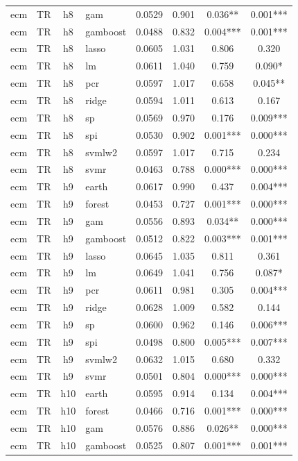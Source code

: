 \begin{ThreePartTable}
\begin{longtable}[t]{llclcccc}
ecm & TR & h8 & gam & 0.0529 & 0.901 & 0.036** & 0.001***\\
ecm & TR & h8 & gamboost & 0.0488 & 0.832 & 0.004*** & 0.001***\\
ecm & TR & h8 & lasso & 0.0605 & 1.031 & 0.806 & 0.320\\
ecm & TR & h8 & lm & 0.0611 & 1.040 & 0.759 & 0.090*\\
ecm & TR & h8 & pcr & 0.0597 & 1.017 & 0.658 & 0.045**\\
ecm & TR & h8 & ridge & 0.0594 & 1.011 & 0.613 & 0.167\\
ecm & TR & h8 & sp & 0.0569 & 0.970 & 0.176 & 0.009***\\
ecm & TR & h8 & spi & 0.0530 & 0.902 & 0.001*** & 0.000***\\
ecm & TR & h8 & svmlw2 & 0.0597 & 1.017 & 0.715 & 0.234\\
ecm & TR & h8 & svmr & 0.0463 & 0.788 & 0.000*** & 0.000***\\
\addlinespace
ecm & TR & h9 & earth & 0.0617 & 0.990 & 0.437 & 0.004***\\
ecm & TR & h9 & forest & 0.0453 & 0.727 & 0.001*** & 0.000***\\
ecm & TR & h9 & gam & 0.0556 & 0.893 & 0.034** & 0.000***\\
ecm & TR & h9 & gamboost & 0.0512 & 0.822 & 0.003*** & 0.001***\\
ecm & TR & h9 & lasso & 0.0645 & 1.035 & 0.811 & 0.361\\
ecm & TR & h9 & lm & 0.0649 & 1.041 & 0.756 & 0.087*\\
ecm & TR & h9 & pcr & 0.0611 & 0.981 & 0.305 & 0.004***\\
ecm & TR & h9 & ridge & 0.0628 & 1.009 & 0.582 & 0.144\\
ecm & TR & h9 & sp & 0.0600 & 0.962 & 0.146 & 0.006***\\
ecm & TR & h9 & spi & 0.0498 & 0.800 & 0.005*** & 0.007***\\
ecm & TR & h9 & svmlw2 & 0.0632 & 1.015 & 0.680 & 0.332\\
ecm & TR & h9 & svmr & 0.0501 & 0.804 & 0.000*** & 0.000***\\
\addlinespace
ecm & TR & h10 & earth & 0.0595 & 0.914 & 0.134 & 0.004***\\
ecm & TR & h10 & forest & 0.0466 & 0.716 & 0.001*** & 0.000***\\
ecm & TR & h10 & gam & 0.0576 & 0.886 & 0.026** & 0.000***\\
ecm & TR & h10 & gamboost & 0.0525 & 0.807 & 0.001*** & 0.001***\\

\end{longtable}
\end{ThreePartTable}
